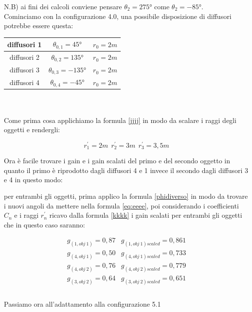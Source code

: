 \documentclass[12pt,a4paper]{report}
\begin{document}
N.B) ai fini dei calcoli conviene pensare $\theta_2=275°$ come $\theta_2=-85°$.\\

Cominciamo con la configurazione 4.0, una possibile disposizione di diffusori potrebbe essere questa:\\

\begin{tabular}{|c|c|c|}
\hline
diffusori 1 & $\theta_{0,1}=45°$ & $r_0=2m$\\
\hline
diffusori 2 & $\theta_{0,2}=135°$ & $r_0=2m$\\
\hline
diffusori 3 & $\theta_{0,3}=-135°$ & $r_0=2m$\\
\hline
diffusori 4 & $\theta_{0,4}=-45°$ & $r_0=2m$\\
\hline
\end{tabular} \\
\\

Come prima cosa applichiamo la formula \ref{jjjj} in modo da scalare i raggi degli oggetti e rendergli:

\[r_1^{\prime}=2m \ \  r_2^{\prime}=3m \ \ r_3^{\prime}=3,5m  \]

Ora è facile trovare i gain e i gain scalati del primo e del secondo oggetto in quanto il primo è riprodotto dagli diffusori 4 e 1 invece il secondo dagli diffusori 3 e 4 in questo modo:

per entrambi gli oggetti, prima applico la formula \ref{phidiverso} in modo da trovare i nuovi angoli da mettere nella formula \ref{eq:eeee}, poi considerando i coefficienti $C_n$ e i raggi $r_n^{\prime}$ ricavo dalla formula \ref{kkkk} i gain scalati per entrambi gli oggetti che in questo caso saranno:

\begin{equation}
\begin{matrix}
g_{(1,obj\ 1)} = 0,87 & g_{(1,obj\ 1)scaled} = 0,861\\
g_{(4,obj\ 1)} = 0,50 & g_{(4,obj\ 1)scaled} = 0,733\\
g_{(4,obj\ 2)} = 0,76 & g_{(4,obj\ 2)scaled} = 0,779\\
g_{(3,obj\ 2)} = 0,64 & g_{(3,obj\ 2)scaled} = 0,651\\
\end{matrix}
\label{gscalatiesempio1}
\end{equation}
\\

Passiamo ora all'adattamento alla configurazione 5.1
\end{document}
